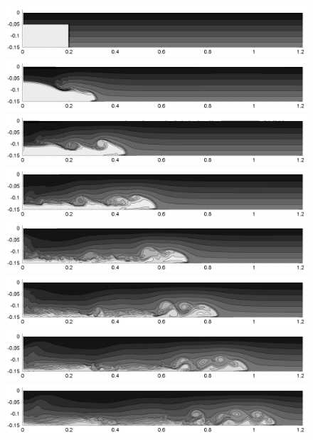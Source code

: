 \begin{figure}[htbp]
  \begin{center}    \includegraphics[scale=0.55]{../figures/colocated/Fig9case/280-120-0075-VE-6-Surf0/01.png}    \includegraphics[scale=0.55]{../figures/colocated/Fig9case/280-120-0075-VE-6-Surf0/02.png}
\includegraphics[scale=0.55]{../figures/colocated/Fig9case/280-120-0075-VE-6-Surf0/03.png}
\includegraphics[scale=0.55]{../figures/colocated/Fig9case/280-120-0075-VE-6-Surf0/04.png}    \includegraphics[scale=0.55]{../figures/colocated/Fig9case/280-120-0075-VE-6-Surf0/05.png}
\includegraphics[scale=0.55]{../figures/colocated/Fig9case/280-120-0075-VE-6-Surf0/06.png}
\includegraphics[scale=0.55]{../figures/colocated/Fig9case/280-120-0075-VE-6-Surf0/07.png}    \includegraphics[scale=0.55]{../figures/colocated/Fig9case/280-120-0075-VE-6-Surf0/08.png}

\end{center}
\end{figure}
